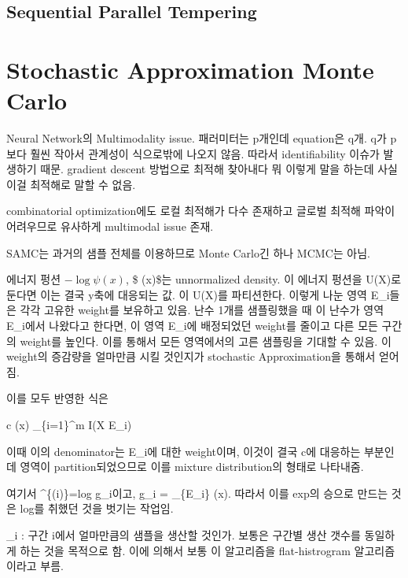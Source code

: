 \documentclass[
]{book}
\begin{document}
\hypertarget{sequential-parallel-tempering}{%
\subsection{Sequential Parallel Tempering}\label{sequential-parallel-tempering}}

\hypertarget{stochastic-approximation-monte-carlo}{%
\section{Stochastic Approximation Monte Carlo}\label{stochastic-approximation-monte-carlo}}

Neural Network의 Multimodality issue. 패러미터는 p개인데 equation은 q개. q가 p보다 훨씬 작아서 관계성이 식으로밖에 나오지 않음. 따라서 identifiability 이슈가 발생하기 때문. gradient descent 방법으로 최적해 찾아내다 뭐 이렇게 말을 하는데 사실 이걸 최적해로 말할 수 없음.

combinatorial optimization에도 로컬 최적해가 다수 존재하고 글로벌 최적해 파악이 어려우므로 유사하게 multimodal issue 존재.

SAMC는 과거의 샘플 전체를 이용하므로 Monte Carlo긴 하나 MCMC는 아님.

에너지 펑션 \(-\log \psi (x)\), \$ \psi (x)\$는 unnormalized density. 이 에너지 펑션을 U(X)로 둔다면 이는 결국 y축에 대응되는 값. 이 U(X)를 파티션한다. 이렇게 나눈 영역 E\_i들은 각각 고유한 weight를 보유하고 있음. 난수 1개를 샘플링했을 때 이 난수가 영역 E\_i에서 나왔다고 한다면, 이 영역 E\_i에 배정되었던 weight를 줄이고 다른 모든 구간의 weight를 높인다. 이를 통해서 모든 영역에서의 고른 샘플링을 기대할 수 있음. 이 weight의 증감량을 얼마만큼 시킬 것인지가 stochastic Approximation을 통해서 얻어짐.

이를 모두 반영한 식은

c \psi(x) \propto \sum\_\{i=1\}\^{}m  I(X \in E\_i)

이때 이의 denominator는 E\_i에 대한 weight이며, 이것이 결국 c에 대응하는 부분인데 영역이 partition되었으므로 이를 mixture distribution의 형태로 나타내줌.

여기서 \theta\^{}\{(i)\}=log g\_i이고, g\_i = \int\_\{E\_i\} \psi(x). 따라서 이를 exp의 승으로 만드는 것은 log를 취했던 것을 벗기는 작업임.

\pi\_i : 구간 i에서 얼마만큼의 샘플을 생산할 것인가. 보통은 구간별 생산 갯수를 동일하게 하는 것을 목적으로 함. 이에 의해서 보통 이 알고리즘을 flat-histrogram 알고리즘이라고 부름.
\end{document}
